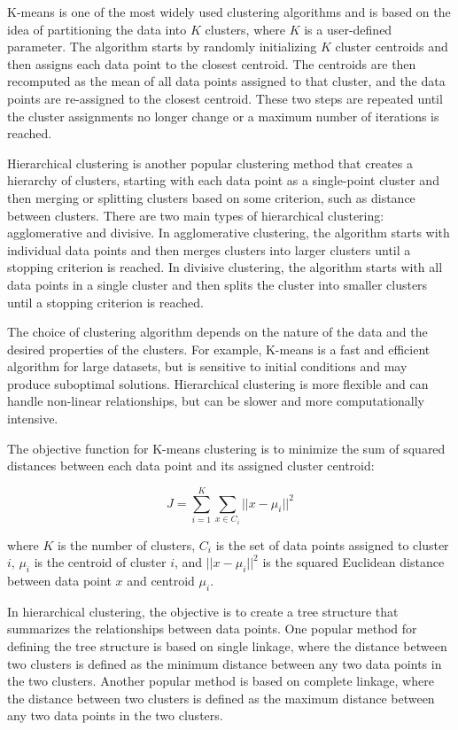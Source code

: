 \documentclass[12pt, a4paper, oneside]{article}
\begin{document}
K-means is one of the most widely used clustering algorithms and is based on the idea of partitioning the data into $K$ clusters, where $K$ is a user-defined parameter. The algorithm starts by randomly initializing $K$ cluster centroids and then assigns each data point to the closest centroid. The centroids are then recomputed as the mean of all data points assigned to that cluster, and the data points are re-assigned to the closest centroid. These two steps are repeated until the cluster assignments no longer change or a maximum number of iterations is reached.

Hierarchical clustering is another popular clustering method that creates a hierarchy of clusters, starting with each data point as a single-point cluster and then merging or splitting clusters based on some criterion, such as distance between clusters. There are two main types of hierarchical clustering: agglomerative and divisive. In agglomerative clustering, the algorithm starts with individual data points and then merges clusters into larger clusters until a stopping criterion is reached. In divisive clustering, the algorithm starts with all data points in a single cluster and then splits the cluster into smaller clusters until a stopping criterion is reached.

The choice of clustering algorithm depends on the nature of the data and the desired properties of the clusters. For example, K-means is a fast and efficient algorithm for large datasets, but is sensitive to initial conditions and may produce suboptimal solutions. Hierarchical clustering is more flexible and can handle non-linear relationships, but can be slower and more computationally intensive.

The objective function for K-means clustering is to minimize the sum of squared distances between each data point and its assigned cluster centroid:

$$ J = \sum_{i=1}^K \sum_{x \in C_i} ||x - \mu_i||^2 $$

where $K$ is the number of clusters, $C_i$ is the set of data points assigned to cluster $i$, $\mu_i$ is the centroid of cluster $i$, and $||x - \mu_i||^2$ is the squared Euclidean distance between data point $x$ and centroid $\mu_i$.

In hierarchical clustering, the objective is to create a tree structure that summarizes the relationships between data points. One popular method for defining the tree structure is based on single linkage, where the distance between two clusters is defined as the minimum distance between any two data points in the two clusters. Another popular method is based on complete linkage, where the distance between two clusters is defined as the maximum distance between any two data points in the two clusters.
\end{document}

